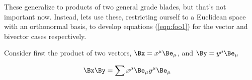 These generalize to products of two general grade blades, but that's not important now.  Instead, lets use these, restricting ourself to a Euclidean space with an orthonormal basis, to develop equations (\ref{eqn:foo1}) for the vector and bivector cases respectively.

Consider first the product of two vectors, $\Bx = x^\mu \Be_\mu$, and $\By = y^\mu \Be_\mu$

\begin{align*}
\Bx \By &= \sum x^\mu \Be_\mu y^\mu \Be_\mu
\end{align*}

\EndArticle
